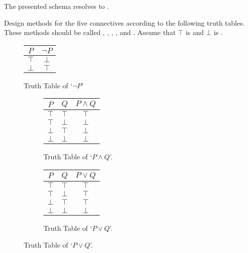 \noindent The presented schema resolves to .

\noindent Design methods for the five connectives according to the following truth tables. These methods should be called , , , , and . Assume that $\top$ is  and $\bot$ is .
\captionsetup[subfigure]{labelformat=empty}
\captionsetup[figure]{labelformat=empty}%
\begin{figure}[H]
\begin{center}
    \begin{tabular}{c|c}
         $P$&$\lnot{P}$\\
         \hline
         $\top$&$\bot$\\
         $\bot$&$\top$
    \end{tabular}
\end{center}
\caption{Truth Table of `$\lnot{P}$'}
\label{fig:ttnotp}
\end{figure}

\begin{figure}[H]
\begin{subfigure}{.5\textwidth}
\begin{center}
    \begin{tabular}{cc|c}
         $P$&$Q$&$P \land {Q} $\\
         \hline
         $\top$&$\top$&$\top$\\
         $\top$&$\bot$&$\bot$\\
         $\bot$&$\top$&$\bot$\\
         $\bot$&$\bot$&$\bot$
    \end{tabular}
\end{center}
\caption{Truth Table of `$P \land Q$'.}
\label{fig:ttpandq}
\end{subfigure}
\begin{subfigure}{.5\textwidth}
\begin{center}
    \begin{tabular}{cc|c}
         $P$&$Q$&$P\lor{Q} $\\
         \hline
         $\top$&$\top$&$\top$\\
         $\top$&$\bot$&$\top$\\
         $\bot$&$\top$&$\top$\\
         $\bot$&$\bot$&$\bot$
    \end{tabular}
\end{center}
\caption{Truth Table of `$P \lor Q$'.}
\label{fig:ttporq}
\end{subfigure}
\end{figure}

